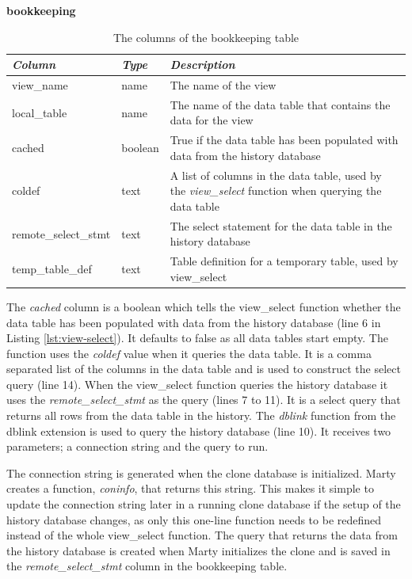 \begin{table}[h]
  \centering
  \textbf{bookkeeping}
  \begin{tabularx}{\textwidth}{llX}
    \textit{Column} & \textit{Type} & \textit{Description} \\
    \midrule
    view\_name & name & The name of the view \\
    local\_table & name & The name of the data table that contains the data for the view \\
    cached & boolean & True if the data table has been populated with data from the history database \\
    coldef & text & A list of columns in the data table, used by the \textit{view\_select} function when querying the data table \\
    remote\_select\_stmt & text & The select statement for the data table in the history database \\
    temp\_table\_def & text & Table definition for a temporary table, used by view\_select \\
  \end{tabularx}
  \caption{The columns of the bookkeeping table}
  \label{tbl:bookkeeping}
\end{table}

The \textit{cached} column is a boolean which tells the view\_select function whether the data table has been populated with data from the history database (line 6 in Listing \ref{lst:view-select}).
It defaults to false as all data tables start empty.
The function uses the \textit{coldef} value when it queries the data table.
It is a comma separated list of the columns in the data table and is used to construct the select query (line 14).
When the view\_select function queries the history database it uses the \textit{remote\_select\_stmt} as the query (lines 7 to 11).
It is a select query that returns all rows from the data table in the history.
The \textit{dblink} function from the dblink extension is used to query the history database (line 10).
It receives two parameters; a connection string and the query to run.

The connection string is generated when the clone database is initialized.
Marty creates a function, \textit{coninfo}, that returns this string.
This makes it simple to update the connection string later in a running clone database if the setup of the history database changes, as only this one-line function needs to be redefined instead of the whole view\_select function.
The query that returns the data from the history database is created when Marty initializes the clone and is saved in the \textit{remote\_select\_stmt} column in the bookkeeping table.


